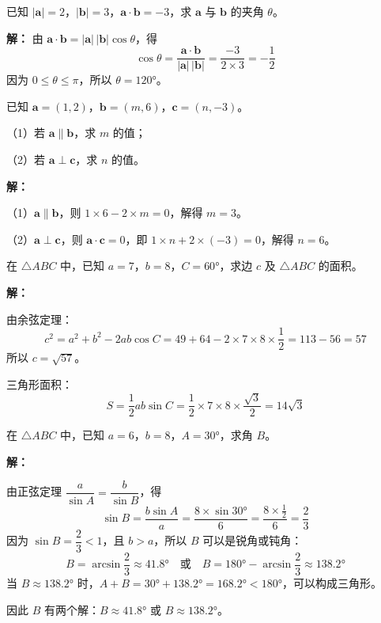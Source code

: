 \documentclass[12pt, a4paper]{ctexart}
\begin{document}
\begin{examplebox}[【例题3】数量积与夹角]
已知 $|\boldsymbol{a}|=2$，$|\boldsymbol{b}|=3$，$\boldsymbol{a}\cdot\boldsymbol{b}=-3$，求 $\boldsymbol{a}$ 与 $\boldsymbol{b}$ 的夹角 $\theta$。

\textbf{解：}
由 $\boldsymbol{a}\cdot\boldsymbol{b}=|\boldsymbol{a}|\,|\boldsymbol{b}|\cos\theta$，得
\[
\cos\theta=\frac{\boldsymbol{a}\cdot\boldsymbol{b}}{|\boldsymbol{a}|\,|\boldsymbol{b}|}=\frac{-3}{2\times3}=-\frac{1}{2}
\]
因为 $0\leqslant\theta\leqslant\pi$，所以 $\theta=120°$。
\end{examplebox}

\begin{examplebox}[【例题4】平行与垂直的判定]
已知 $\boldsymbol{a}=(1,2)$，$\boldsymbol{b}=(m,6)$，$\boldsymbol{c}=(n,-3)$。

（1）若 $\boldsymbol{a}\parallel\boldsymbol{b}$，求 $m$ 的值；

（2）若 $\boldsymbol{a}\perp\boldsymbol{c}$，求 $n$ 的值。

\textbf{解：}

（1）$\boldsymbol{a}\parallel\boldsymbol{b}$，则 $1\times6-2\times m=0$，解得 $m=3$。

（2）$\boldsymbol{a}\perp\boldsymbol{c}$，则 $\boldsymbol{a}\cdot\boldsymbol{c}=0$，即 $1\times n+2\times(-3)=0$，解得 $n=6$。
\end{examplebox}

\begin{examplebox}[【例题5】利用余弦定理解三角形]
在 $\triangle ABC$ 中，已知 $a=7$，$b=8$，$C=60°$，求边 $c$ 及 $\triangle ABC$ 的面积。

\textbf{解：}

由余弦定理：
\[
c^2=a^2+b^2-2ab\cos C=49+64-2\times7\times8\times\frac{1}{2}=113-56=57
\]
所以 $c=\sqrt{57}$。

三角形面积：
\[
S=\frac{1}{2}ab\sin C=\frac{1}{2}\times7\times8\times\frac{\sqrt{3}}{2}=14\sqrt{3}
\]
\end{examplebox}

\begin{examplebox}
在 $\triangle ABC$ 中，已知 $a=6$，$b=8$，$A=30°$，求角 $B$。

\textbf{解：}

由正弦定理 $\dfrac{a}{\sin A}=\dfrac{b}{\sin B}$，得
\[
\sin B=\frac{b\sin A}{a}=\frac{8\times\sin30°}{6}=\frac{8\times\frac{1}{2}}{6}=\frac{2}{3}
\]
因为 $\sin B=\dfrac{2}{3}<1$，且 $b>a$，所以 $B$ 可以是锐角或钝角：
\[
B=\arcsin\frac{2}{3}\approx41.8°\quad\text{或}\quad B=180°-\arcsin\frac{2}{3}\approx138.2°
\]
当 $B\approx138.2°$ 时，$A+B=30°+138.2°=168.2°<180°$，可以构成三角形。

因此 $B$ 有两个解：$B\approx41.8°$ 或 $B\approx138.2°$。
\end{examplebox}
\end{document}

